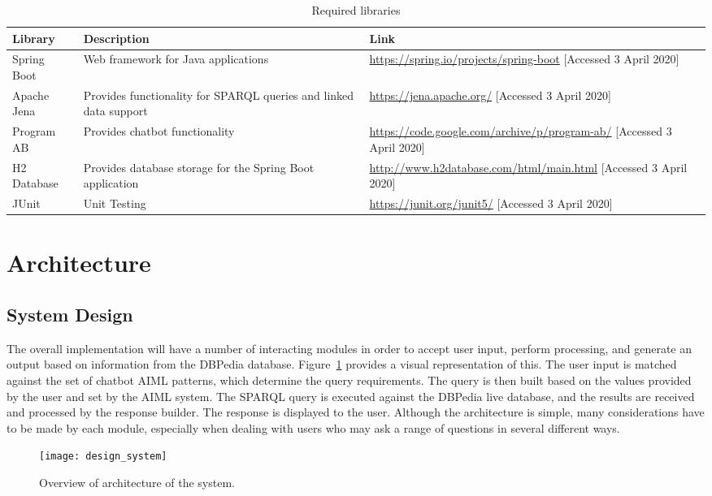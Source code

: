\begin{table}[h]
	\begin{tabularx}{\textwidth}{XXX}
		\toprule
		Library & Description & Link \\
		\midrule
		Spring Boot & Web framework for Java applications & \url{https://spring.io/projects/spring-boot} [Accessed 3 April 2020] \\
		\midrule
		Apache Jena & Provides functionality for SPARQL queries and linked data support & \url{https://jena.apache.org/} [Accessed 3 April 2020]\\
		\midrule
		Program AB & Provides chatbot functionality & \url{https://code.google.com/archive/p/program-ab/} [Accessed 3 April 2020]\\
		\midrule
		H2 Database & Provides database storage for the Spring Boot application & \url{http://www.h2database.com/html/main.html} [Accessed 3 April 2020] \\
		\midrule
		JUnit & Unit Testing & \url{https://junit.org/junit5/} [Accessed 3 April 2020] \\
		\bottomrule
	\end{tabularx}
	\caption{Required libraries}
	\label{tab:libraries}
\end{table}

\newpage
\section{Architecture}
\subsection{System Design}
\label{sec:systemdesign}
The overall implementation will have a number of interacting modules in order to accept user input, perform processing, and generate an output based on information from the DBPedia database. Figure~\ref{fig:design_system} provides a visual representation of this. The user input is matched against the set of chatbot AIML patterns, which determine the query requirements. The query is then built based on the values provided by the user and set by the AIML system. The SPARQL query is executed against the DBPedia live database, and the results are received and processed by the response builder. The response is displayed to the user. Although the architecture is simple, many considerations have to be made by each module, especially when dealing with users who may ask a range of questions in several different ways.

\begin{figure}[h]
	\begin{center}
		\texttt{[image: design\_system]}
	\end{center}
	\caption{Overview of architecture of the system.}
	\label{fig:design_system}
\end{figure}

